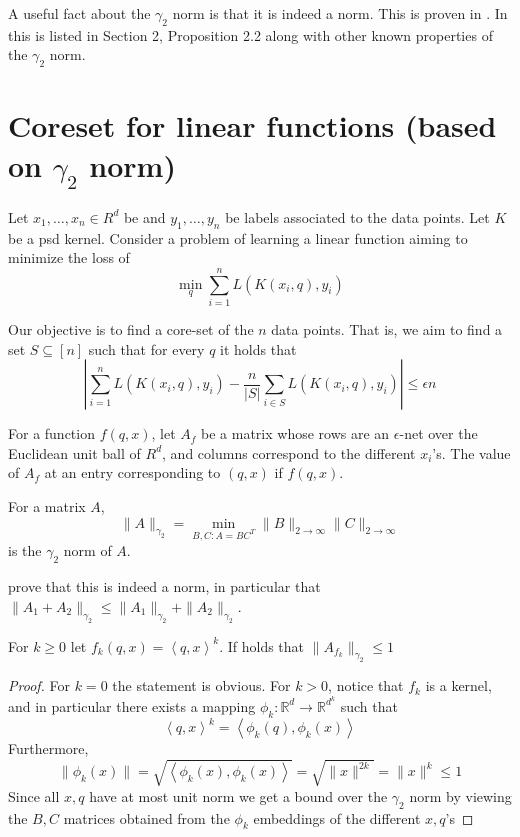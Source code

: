 \documentclass[anon,12pt]{colt2019} %
\newcommand{\ip}[1]{\left \langle #1 \right \rangle}
\newcommand{\R}{\mathbb{R}}
\newcommand{\eps}{\epsilon}
\begin{document}
A useful fact about the $\gamma_2$ norm is that it is indeed a norm. This is proven in \cite{tomczak1989banach}. In \cite{matouvsek2014factorization} this is listed in Section 2, Proposition 2.2 along with other known properties of the $\gamma_2$ norm. 





\section{Coreset for linear functions (based on $\gamma_2$ norm)}

Let $x_1,\ldots,x_n \in R^d$ be and $y_1,\ldots,y_n$ be labels associated to the data points. Let $K$ be a psd kernel. Consider a problem of learning a linear function aiming to minimize the loss of 
$$\min_q \sum_{i=1}^n L(K(x_i, q), y_i)$$

Our objective is to find a core-set of the $n$ data points. That is, we aim to find a set $S \subseteq [n]$ such that for every $q$ it holds that 
$$ \left| \sum_{i=1}^n L(K(x_i, q), y_i) - \frac{n}{|S|} \sum_{i \in S} L(K(x_i, q), y_i) \right| \leq \eps n $$

For a function $f(q,x)$, let $A_f$ be a matrix whose rows are an $\eps$-net over the Euclidean unit ball of $R^d$, and columns correspond to the different $x_i$'s. The value of $A_f$ at an entry corresponding to $(q,x)$ if $f(q,x)$.

\begin{definition}
For a matrix $A$,
$$ \|A\|_{\gamma_2} = \min_{B,C: A=BC^T} \|B\|_{2 \to \infty} \|C\|_{2 \to \infty}$$
is the $\gamma_2$ norm of $A$. 
\end{definition}
 \cite{tomczak1989banach} prove that this is indeed a norm, in particular that 
 $\|A_1+A_2\|_{\gamma_2} \leq \|A_1\|_{\gamma_2} + \|A_2\|_{\gamma_2}$. 


\begin{lemma} \label{lem:powers}
For $k \geq 0$ let $f_k(q,x) = \ip{q,x}^k$. If holds that $\|A_{f_k}\|_{\gamma_2} \leq 1$
\end{lemma}
\begin{proof}
For $k=0$ the statement is obvious. For $k>0$, notice that $f_k$ is a kernel, and in particular there exists a mapping $\phi_k: \R^d \to \R^{d^k}$ such that
$$ \ip{q,x}^k = \ip{\phi_k(q), \phi_k(x)} $$
Furthermore, 
$$ \|\phi_k(x)\| = \sqrt{\ip{\phi_k(x), \phi_k(x)}} = \sqrt{\|x\|^{2k}} = \|x\|^k \leq 1 $$
Since all $x,q$ have at most unit norm we get a bound over the $\gamma_2$ norm by viewing the $B,C$ matrices obtained from the $\phi_k$ embeddings of the different $x,q$'s
\end{proof}
\end{document}
